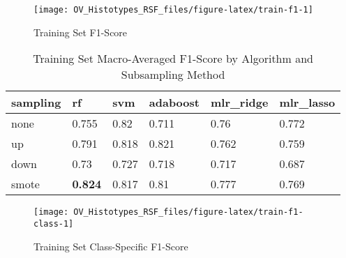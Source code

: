 \documentclass[
]{report}
\begin{document}
\begin{figure}[H]

{\centering \texttt{[image: OV\_Histotypes\_RSF\_files/figure-latex/train-f1-1]} 

}

\caption{Training Set F1-Score}\label{fig:train-f1}
\end{figure}

\begin{table}

\caption{\label{tab:train-f1-table}Training Set Macro-Averaged F1-Score by Algorithm and Subsampling Method}
\centering
\begin{tabular}[t]{l|l|l|l|l|l}
\hline
sampling & rf & svm & adaboost & mlr\_ridge & mlr\_lasso\\
\hline
none & 0.755 & 0.82 & 0.711 & 0.76 & 0.772\\
\hline
up & 0.791 & 0.818 & 0.821 & 0.762 & 0.759\\
\hline
down & 0.73 & 0.727 & 0.718 & 0.717 & 0.687\\
\hline
smote & \textbf{0.824} & 0.817 & 0.81 & 0.777 & 0.769\\
\hline
\end{tabular}
\end{table}

\begin{figure}[H]

{\centering \texttt{[image: OV\_Histotypes\_RSF\_files/figure-latex/train-f1-class-1]} 

}

\caption{Training Set Class-Specific F1-Score}\label{fig:train-f1-class}
\end{figure}
\end{document}
